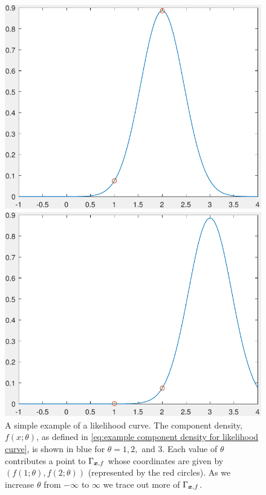 \begin{figure}[ht]
\begin{minipage}[b]{0.3\linewidth}
			\end{minipage}
			\begin{minipage}[b]{0.3\linewidth}
				\includegraphics[width=\textwidth]{GammaTraceDensity02}
			\end{minipage}
			\begin{minipage}[b]{0.3\linewidth}
				\includegraphics[width=\textwidth]{GammaTraceDensity03}
			\end{minipage}
			\caption[A simple example of a likelihood curve.]{A simple example of a likelihood curve. The component density, $f(x;\theta)$, as defined in \eqref{eq:example component density for likelihood curve}, is shown in blue for $\theta = 1,2,$ and $3$. Each value of $\theta$ contributes a point to $\Gamma_{{\bm{{x}}}, f}$ whose coordinates are given by $(f(1;\theta),f(2;\theta))$ (represented by the red circles). As we increase $\theta$ from $-\infty$ to $\infty$ we trace out more of $\Gamma_{{\bm{{x}}}, f}$.}\label{fig:TracingGamma}
		\end{figure}

